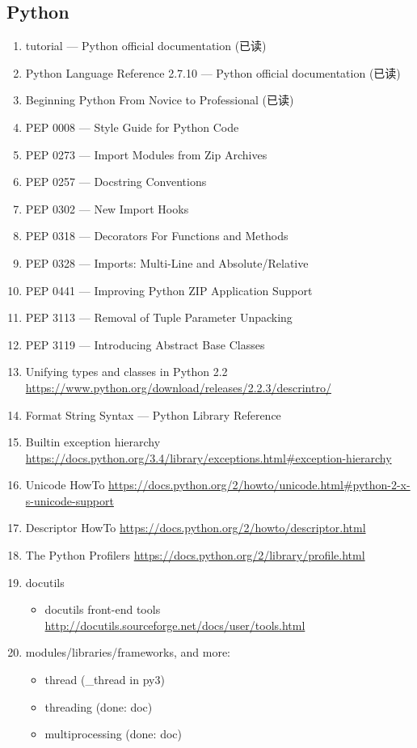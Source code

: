 \documentclass{article}
\begin{document}
\subsection{Python}
\begin{enumerate}
    \item tutorial --- Python official documentation (已读)
    \item Python Language Reference 2.7.10 --- Python official documentation (已读)
    \item Beginning Python From Novice to Professional (已读)
    \item PEP 0008 --- Style Guide for Python Code
    \item PEP 0273 --- Import Modules from Zip Archives
    \item PEP 0257 --- Docstring Conventions
    \item PEP 0302 --- New Import Hooks
    \item PEP 0318 --- Decorators For Functions and Methods
    \item PEP 0328 --- Imports: Multi-Line and Absolute/Relative
    \item PEP 0441 --- Improving Python ZIP Application Support
    \item PEP 3113 --- Removal of Tuple Parameter Unpacking
    \item PEP 3119 --- Introducing Abstract Base Classes
    \item Unifying types and classes in Python 2.2 \url{https://www.python.org/download/releases/2.2.3/descrintro/}
    \item Format String Syntax --- Python Library Reference
    \item Builtin exception hierarchy \url{https://docs.python.org/3.4/library/exceptions.html#exception-hierarchy}
    \item Unicode HowTo \url{https://docs.python.org/2/howto/unicode.html#python-2-x-s-unicode-support}
    \item Descriptor HowTo \url{https://docs.python.org/2/howto/descriptor.html}
    \item The Python Profilers \url{https://docs.python.org/2/library/profile.html}
    \item docutils
        \begin{itemize}
            \item docutils front-end tools \url{http://docutils.sourceforge.net/docs/user/tools.html}
        \end{itemize}
    \item modules/libraries/frameworks, and more:
        \begin{itemize}
            \item thread (_thread in py3)
            \item threading (done: doc)
            \item multiprocessing (done: doc)


\end{itemize}
\end{enumerate}
\end{document}
